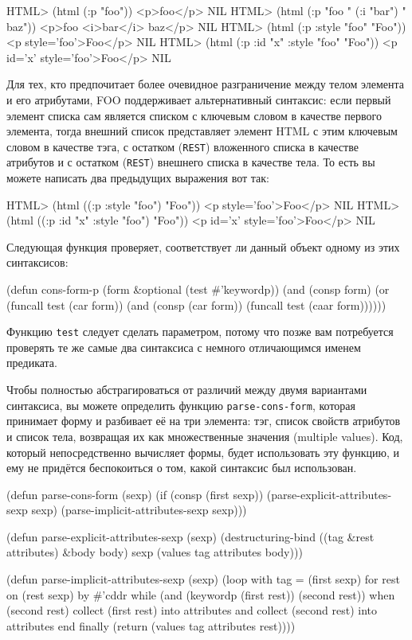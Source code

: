 \begin{myverb}
  HTML> (html (:p "foo"))
  <p>foo</p>
  NIL
  HTML> (html (:p "foo " (:i "bar") " baz"))
  <p>foo <i>bar</i> baz</p>
  NIL
  HTML> (html (:p :style "foo" "Foo"))
  <p style='foo'>Foo</p>
  NIL
  HTML> (html (:p :id "x" :style "foo" "Foo"))
  <p id='x' style='foo'>Foo</p>
  NIL
\end{myverb}

Для тех, кто предпочитает более очевидное разграничение между телом элемента и его
атрибутами, FOO поддерживает альтернативный синтаксис: если первый элемент списка сам
является списком с ключевым словом в качестве первого элемента, тогда внешний список
представляет элемент HTML с этим ключевым словом в качестве тэга, с остатком (\lstinline{REST})
вложенного списка в качестве атрибутов и с остатком (\lstinline{REST}) внешнего списка в
качестве тела. То есть вы можете написать два предыдущих выражения вот так:

\begin{myverb}
  HTML> (html ((:p :style "foo") "Foo"))
  <p style='foo'>Foo</p>
  NIL
  HTML> (html ((:p :id "x" :style "foo") "Foo"))
  <p id='x' style='foo'>Foo</p>
  NIL
\end{myverb}

Следующая функция проверяет, соответствует ли данный объект одному из этих синтаксисов:

\begin{myverb}
(defun cons-form-p (form &optional (test #'keywordp))
  (and (consp form)
       (or (funcall test (car form))
           (and (consp (car form)) (funcall test (caar form))))))
\end{myverb}

Функцию \lstinline{test} следует сделать параметром, потому что позже вам потребуется проверять
те же самые два синтаксиса с немного отличающимся именем предиката.

Чтобы полностью абстрагироваться от различий между двумя вариантами синтаксиса, вы можете
определить функцию \lstinline{parse-cons-form}, которая принимает форму и разбивает её на три
элемента: тэг, список свойств атрибутов и список тела, возвращая их как множественные
значения (multiple values). Код, который непосредственно вычисляет формы, будет
использовать эту функцию, и ему не придётся беспокоиться о том, какой синтаксис был
использован.

\begin{myverb}
(defun parse-cons-form (sexp)
  (if (consp (first sexp))
    (parse-explicit-attributes-sexp sexp)
    (parse-implicit-attributes-sexp sexp)))

(defun parse-explicit-attributes-sexp (sexp)
  (destructuring-bind ((tag &rest attributes) &body body) sexp
    (values tag attributes body)))

(defun parse-implicit-attributes-sexp (sexp)
  (loop with tag = (first sexp)
     for rest on (rest sexp) by #'cddr
     while (and (keywordp (first rest)) (second rest))
     when (second rest)
       collect (first rest) into attributes and
       collect (second rest) into attributes
     end
     finally (return (values tag attributes rest))))
\end{myverb}

